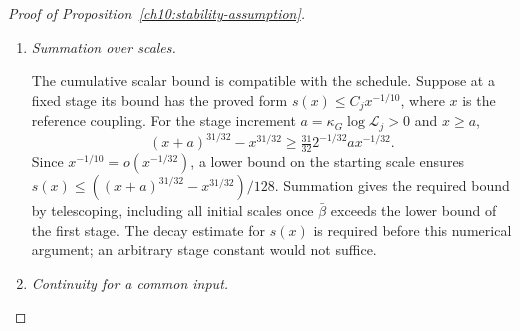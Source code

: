 \begin{proof}[Proof of Proposition~\ref{ch10:stability-assumption}]
\begin{enumerate}[label=\emph{Step \arabic*.},ref=\arabic*,leftmargin=*,align=left]
Arrays with a prescribed large-field set retain one required large-field factor throughout
the exact regrouping. Work with their coefficientwise majorants, not separately
chosen value bounds. A raw hard bound $a_h\le C e^{-cP(y)^2}$,
where $P(y)=e^{(\log\log y)^2}$, is negligible compared with any
fixed fraction $\phi$ of $e^{-P(x)^{1/5}}$. The soft correction has
series bound $a_s\le y^{-1/8}$. Put $p=y^{1/16}$ and
$\zeta=-\log(\phi p)\ge0$. Then
$I=e^\zeta a_h+2a_s\le(8p)^{-1}+2a_s$ eventually, the support
ball count times $I$ tends to zero, and
\[
 e^{-\zeta}(e^I-1)\le\phi(1/4+4pa_s)\le\phi.
\]
This is precisely the estimate of the exact regrouping, with the hard factor
retained once. Radius reduction by a fixed factor converts the
finite-evaluation coefficient bounds into one summable majorant at every
support. Indicators of the eligibility conditions are parameter independent and
preserve it. The result proves both inequalities
\eqref{ch10:finite-tests}, with arbitrarily small fixed $d$, for the
protected local construction. The inverse coupling bound above gives
$s_m=2f_m\le C_jx^{-1/10}$ needed for cumulative control.

This argument uses the real-node bounds for the same protected local
sectors on the reserved inverse coupling band. Those bounds follow by applying
the real estimates of Chapter~\ref{ch06:large-fields} with their
constants fixed on that band; the rescaling keeps all fine reads and
event indicators fixed. It adds a parameter estimate to that construction,
not a differentiation of measurable cutoff indicators.

\item \emph{Summation over scales.}

The cumulative scalar bound is compatible with the schedule.
Suppose at a fixed stage its bound has the proved form
$s(x)\le C_j x^{-1/10}$, where $x$ is the reference coupling.
For the stage increment $a=\kappa_G\log\mathscr L_j>0$ and $x\ge a$,
\[
 (x+a)^{31/32}-x^{31/32}
 \ge\tfrac{31}{32}2^{-1/32}a x^{-1/32}.
\]
Since $x^{-1/10}=o(x^{-1/32})$, a lower bound on the starting scale ensures
$s(x)\le((x+a)^{31/32}-x^{31/32})/128$.
Summation gives the required bound by telescoping, including all
initial scales once $\bar\beta$ exceeds the lower bound of the first stage.
The decay estimate for $s(x)$ is required before this numerical
argument; an arbitrary stage constant would not suffice.

\item \emph{Continuity for a common input.}
\label{ch10:cutoff-supplier}


\end{enumerate}
\end{proof}
